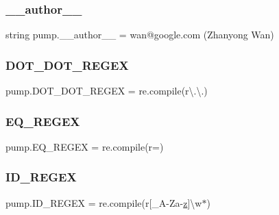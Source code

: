 \subsubsection{\texorpdfstring{\_\_author\_\_}{\_\_author\_\_}}
{\footnotesize\ttfamily string pump.\+\_\+\+\_\+author\+\_\+\+\_\+ = \textquotesingle{}wan@google.\+com (Zhanyong Wan)\textquotesingle{}\hspace{0.3cm}{\ttfamily [private]}}

\mbox{\label{namespacepump_a45644ad738e584ec754f6d9f45fe693c}} 
\subsubsection{\texorpdfstring{DOT\_DOT\_REGEX}{DOT\_DOT\_REGEX}}
{\footnotesize\ttfamily pump.\+D\+O\+T\+\_\+\+D\+O\+T\+\_\+\+R\+E\+G\+EX = re.\+compile(r\textquotesingle{}\textbackslash{}.\textbackslash{}.\textquotesingle{})}

\mbox{\label{namespacepump_a6397ed9bab62b5c6f60a6626f6b287e0}} 
\subsubsection{\texorpdfstring{EQ\_REGEX}{EQ\_REGEX}}
{\footnotesize\ttfamily pump.\+E\+Q\+\_\+\+R\+E\+G\+EX = re.\+compile(r\textquotesingle{}=\textquotesingle{})}

\mbox{\label{namespacepump_a8e008923b6c378b8d3df611fb07d6dda}} 
\subsubsection{\texorpdfstring{ID\_REGEX}{ID\_REGEX}}
{\footnotesize\ttfamily pump.\+I\+D\+\_\+\+R\+E\+G\+EX = re.\+compile(r\textquotesingle{}\mbox{[}\+\_\+A-\/Za-\/\mbox{\hyperlink{_obj__test_2lib_2googletest-master_2googlemock_2test_2gmock-matchers__test_8cc_a196ff6a287f53f758b1506f21269fc77}{z}}\mbox{]}\textbackslash{}w$\ast$\textquotesingle{})}

\mbox{\label{namespacepump_a81f03eaffd2c0f4c6a453a0b179e51ca}} 
